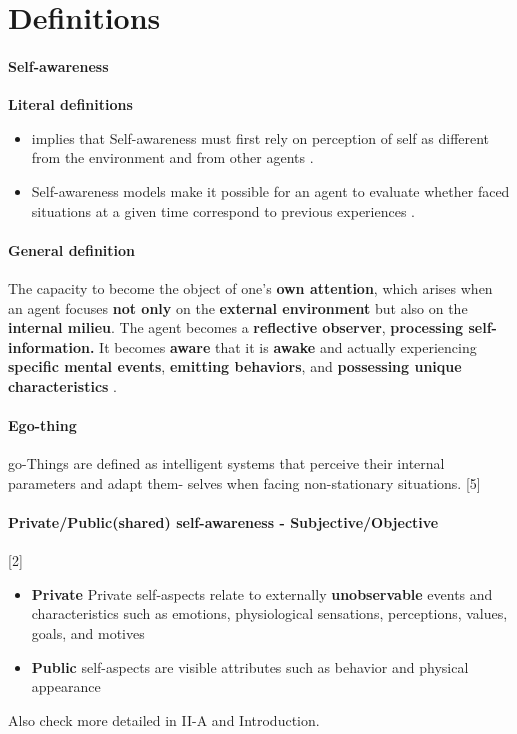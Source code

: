 \documentclass{article}
\begin{document}
	\section{Definitions}
		\paragraph{Self-awareness}
		\textbf{Literal definitions}
		 \begin{itemize}
		 	\item implies that Self-awareness must first rely on perception of self as different from the environment and from other agents \cite{chatila-2018-toward-self-aware-robots}.
		 	\item Self-awareness models make it possible for an agent to evaluate whether faced situations at a given time correspond to previous experiences \cite{ravanbakhsh-2018-hierarchy-of-gans-for-learning-embodied-self-awareness-model}.
		 \end{itemize}
		
		\paragraph{General definition} The capacity to become the object of one’s \textbf{own attention}, which arises when an agent focuses \textbf{not only} on the \textbf{external environment} but also on the \textbf{internal milieu}. The agent becomes a \textbf{reflective observer}, \textbf{processing self-information.} It becomes \textbf{aware} that it is \textbf{awake} and actually experiencing \textbf{specific mental events}, \textbf{emitting behaviors}, and \textbf{possessing unique characteristics} \citet{morin-2006-levels-of-consciousness-and-self-awareness-a-comparison-and-integration-of-various-neurocognitive-views}.
		\paragraph{Ego-thing} go-Things are defined as intelligent
		systems that perceive their internal parameters and adapt them-
		selves when facing non-stationary situations. \citet{kanapram-2019-dynamic-bayesian-approach-for-decision-making-in-ego-things}[5]
		\paragraph{Private/Public(shared) self-awareness - Subjective/Objective}  \citet{regazzoni-2020-multi-sensorial-generative-and-descriptive-self-awareness-models-for-autonomous-systems}[2]
			\begin{itemize}
				\item \textbf{Private} Private self-aspects relate to externally \textbf{unobservable} events and characteristics such as emotions, physiological sensations, perceptions, values, goals, and motives
				\item \textbf{Public} self-aspects are visible attributes such as behavior and physical appearance
			\end{itemize}
			Also check more detailed in \cite{lewis-2011-a-survey-of-self-awareness-and-its-application-in-computing-systems} II-A and \cite{baydoun-2018-a-multi-perspective-approach-to-anomaly-detection-for-self-aware-embodied-agents} Introduction.
\end{document}
